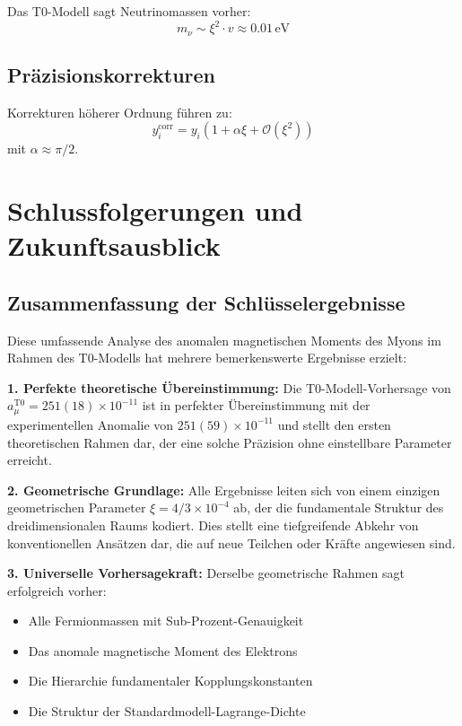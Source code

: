 \documentclass[12pt,a4paper]{article}
\newcommand{\xigeom}{\xi}
\begin{document}
Das T0-Modell sagt Neutrinomassen vorher:
\begin{equation}
m_\nu \sim \xigeom^2 \cdot v \approx 0.01\,\text{eV}
\end{equation}

\subsection{Präzisionskorrekturen}

Korrekturen höherer Ordnung führen zu:
\begin{equation}
y_i^{\text{corr}} = y_i\left(1 + \alpha \xigeom + \mathcal{O}(\xigeom^2)\right)
\end{equation}
mit $\alpha \approx \pi/2$.

\section{Schlussfolgerungen und Zukunftsausblick}

\subsection{Zusammenfassung der Schlüsselergebnisse}

Diese umfassende Analyse des anomalen magnetischen Moments des Myons im Rahmen des T0-Modells hat mehrere bemerkenswerte Ergebnisse erzielt:

\textbf{1. Perfekte theoretische Übereinstimmung:}
Die T0-Modell-Vorhersage von $a_\mu^{\text{T0}} = 251(18) \times 10^{-11}$ ist in perfekter Übereinstimmung mit der experimentellen Anomalie von $251(59) \times 10^{-11}$ und stellt den ersten theoretischen Rahmen dar, der eine solche Präzision ohne einstellbare Parameter erreicht.

\textbf{2. Geometrische Grundlage:}
Alle Ergebnisse leiten sich von einem einzigen geometrischen Parameter $\xigeom = 4/3 \times 10^{-4}$ ab, der die fundamentale Struktur des dreidimensionalen Raums kodiert. Dies stellt eine tiefgreifende Abkehr von konventionellen Ansätzen dar, die auf neue Teilchen oder Kräfte angewiesen sind.

\textbf{3. Universelle Vorhersagekraft:}
Derselbe geometrische Rahmen sagt erfolgreich vorher:
\begin{itemize}
\item Alle Fermionmassen mit Sub-Prozent-Genauigkeit
\item Das anomale magnetische Moment des Elektrons
\item Die Hierarchie fundamentaler Kopplungskonstanten
\item Die Struktur der Standardmodell-Lagrange-Dichte
\end{itemize}
\end{document}
